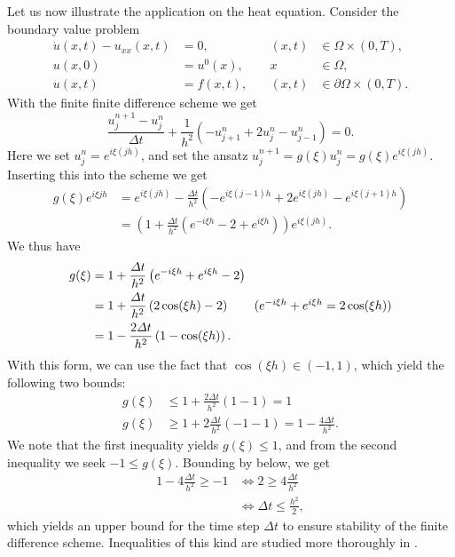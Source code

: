 \documentclass{article}
\begin{document}
Let us now illustrate the application on the heat equation. Consider the boundary value problem
$$ \begin{aligned}
    \dot{u}(x,t) - u_{xx}(x,t) &= 0, &\quad (x,t) &\in \Omega \times (0,T), \\
    u(x,0)                  &= u^0(x), &\quad x &\in \Omega, \\
    u(x,t)                  &= f(x,t), &\quad (x,t) &\in \partial\Omega \times (0,T).
\end{aligned} $$
With the finite finite difference scheme we get
$$ \frac{u^{n+1}_j - u^n_j}{\Delta t} + \frac{1}{h^2} (-u^n_{j+1} +2u^n_j - u^n_{j-1}) = 0.$$
Here we set $u_j^n = e^{i\xi (jh)}$, and set the ansatz $u_j^{n+1} = g(\xi) u_j^n = g(\xi) e^{i\xi (jh)}$. Inserting this into the scheme we get
\begin{align*}
g(\xi) e^{i\xi j h} &= e^{i\xi (jh)} - \frac{\Delta t}{h^2}\left(-e^{i\xi (j-1) h} + 2e^{i\xi (jh)} - e^{i\xi (j+1) h}\right)\\
&= \left(1 + \frac{\Delta t}{h^2}\left(e^{-i\xi h} - 2 + e^{i\xi h}\right)\right)e^{i\xi(jh)}.
\end{align*}
We thus have
\begin{align*}
g(\xi) &= 1 + \frac{\Delta t}{h^2}\left(e^{-i\xi h} + e^{i\xi h}- 2 \right) \\
&= 1 + \frac{\Delta t}{h^2}\left(2\cos(\xi h) - 2\right) \tag{$e^{-i\xi h} + e^{i\xi h} = 2\cos(\xi h)$} \\
&= 1 - \frac{2\Delta t}{h^2}\left(1 - \cos(\xi h)\right).
\end{align*}
With this form, we can use the fact that $\cos(\xi h) \in (-1,1)$, which yield the following two bounds:
\begin{align*}
    g(\xi) &\leq 1 + \frac{2\Delta t}{h^2}(1-1) = 1 \\
    g(\xi) &\geq 1 + 2\frac{\Delta t}{h^2}(-1-1)  = 1 - \frac{4\Delta t}{h^2}.
\end{align*}
We note that the first inequality yields $g(\xi)\leq 1$, and from the second inequality we seek $-1\leq g(\xi)$. Bounding by below, we get
\begin{align*}
    1-4\frac{\Delta t}{h^2} \geq -1 &\iff 2\geq 4\frac{\Delta t}{h^2}\\
    &\iff \Delta t \leq \frac{h^2}{2},
\end{align*}
which yields an upper bound for the time step $\Delta t$ to ensure stability of the finite difference scheme. Inequalities of this kind are studied more thoroughly in \cite{LeVeque2007}.
\end{document}
